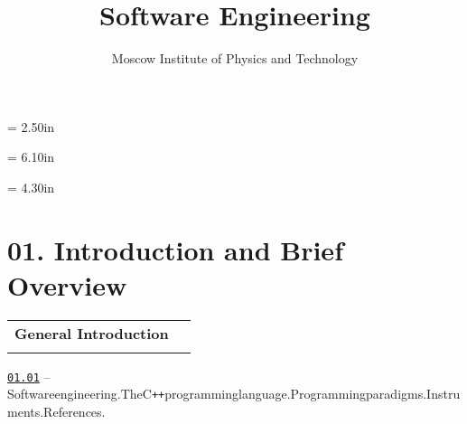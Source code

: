 \documentclass[a4paper,12pt]{article}
\renewenvironment{itemize}
{
    \begin{list}{\labelitemi}
    {
      \setlength{\topsep}{0pt}
      \setlength{\partopsep}{0pt}
      \setlength{\parskip}{0pt}
      \setlength{\itemsep}{0pt}
      \setlength{\parsep}{0pt}
      \setlength{\leftmargin}{14.5pt}
    }
}{\end{list}}
\begin{document}
\newpage\thispagestyle{empty}\pdfpageheight = 2.50in\enlargethispage{100in}

\title{\bf Software Engineering} 

\author{Moscow Institute of Physics and Technology}

\date{}

\maketitle



\newpage\thispagestyle{empty}\pdfpageheight = 6.10in\enlargethispage{100in}

\renewcommand\contentsname{\Large Table of Contents}

\renewcommand{\cftdotsep}{0.5}

\renewcommand{\cftsecleader}{\cftdotfill{\cftdotsep}}

\makeatletter
\let\latexl@section\l@section
\def\l@section#1#2{\begingroup\let\numberline\@gobble\latexl@section{#1}{#2}\endgroup}
\makeatother

\titlelabel{}

\thispagestyle{empty}\tableofcontents\thispagestyle{empty}



\newpage\thispagestyle{empty}\pdfpageheight = 4.30in\enlargethispage{100in}

\section{01. Introduction and Brief Overview}

\begin{tabular}{!{\vrule width 1pt}L{4.1cm}!{\vrule width 1pt}L{14.9cm}!{\vrule width 0pt}} 


\textbf{General Introduction} & \\


\end{tabular}

\medskip\smallskip

\begin{itemize}
    
    \item \href{https://github.com/i-s-m-mipt/Education/blob/master/projects/examples/source/01.01.pdf}{\texttt{01.01}} -- Software\:engineering.\:The\:C\texttt{++}\:programming\:language.\:Programming\:paradigms.\:Instruments.\:References.
    
\end{itemize}
\end{document}
